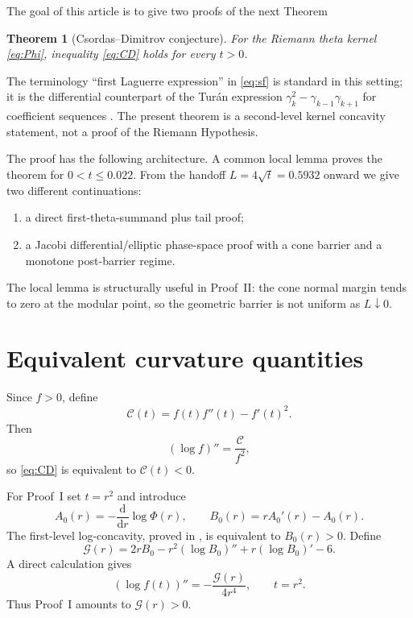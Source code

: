 \documentclass{amsart}
\numberwithin{equation}{section}
\newtheorem{theorem}{Theorem}[section]
\theoremstyle{definition}
\theoremstyle{remark}
\newcommand{\Ccal}{\mathcal C}
\newcommand{\Gcal}{\mathcal G}
\newcommand{\D}{\mathrm d}
\begin{document}
The goal of this article is to give two proofs of the next Theorem 
\begin{theorem}[Csordas--Dimitrov conjecture]\label{thm:main}
For the Riemann theta kernel \eqref{eq:Phi}, inequality \eqref{eq:CD} holds for every $t>0$.
\end{theorem}

The terminology ``first Laguerre expression'' in \eqref{eq:sf} is standard in this setting; it is the differential counterpart of the Tur\'an expression $\gamma_k^2-\gamma_{k-1}\gamma_{k+1}$ for coefficient sequences \cite{CravenCsordas2002,Csordas2015}.  The present theorem is a second-level kernel concavity statement, not a proof of the Riemann Hypothesis.

The proof has the following architecture.  A common local lemma proves the theorem for $0<t\le0.022$.  From the handoff $L=4\sqrt t=0.5932$ onward we give two different continuations:
\begin{enumerate}
\item[(I)]
a direct first-theta-summand plus tail proof;
\item[(II)] a Jacobi differential/elliptic phase-space proof with a cone barrier and a monotone post-barrier regime.
\end{enumerate}
The local lemma is structurally useful in Proof~II: the cone normal margin tends to zero at the modular point, so the geometric barrier is not uniform as $L\downarrow0$.

\section{Equivalent curvature quantities}
Since $f>0$, define
\begin{equation}\label{eq:Ccal}
 \Ccal(t)=f(t)f''(t)-f'(t)^2.
\end{equation}
Then
\begin{equation}\label{eq:Ceq}
 (\log f)''=\frac{\Ccal}{f^2},
\end{equation}
so \eqref{eq:CD} is equivalent to $\Ccal(t)<0$.

For Proof~I set $t=r^2$ and introduce
\begin{equation}\label{eq:ABdirect}
 A_0(r)=-\frac{\D}{\D r}\log\Phi(r),\qquad
 B_0(r)=rA_0'(r)-A_0(r).
\end{equation}
The first-level log-concavity, proved in \cite[Theorem~4.2(b)]{Csordas2015}, is equivalent to $B_0(r)>0$.  Define
\begin{equation}\label{eq:Gdirect}
 \Gcal(r)=2rB_0-r^2(\log B_0)''+r(\log B_0)'-6.
\end{equation}
A direct calculation gives
\begin{equation}\label{eq:Gidentity}
 \boxed{\qquad (\log f(t))''=-\frac{\Gcal(r)}{4r^4},\qquad t=r^2.\qquad}
\end{equation}
Thus Proof~I amounts to $\Gcal(r)>0$.
\end{document}
